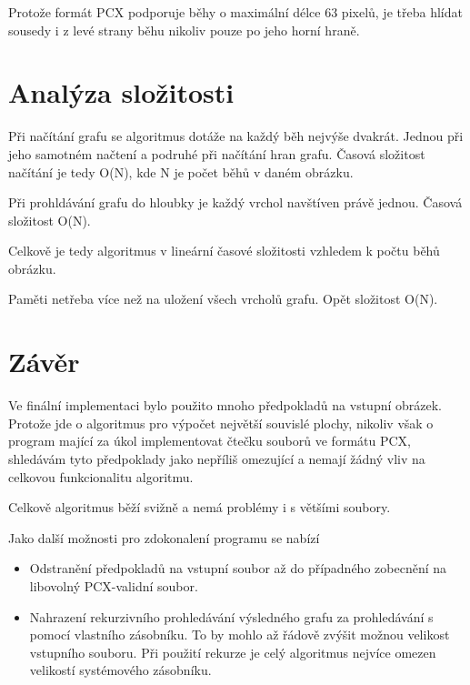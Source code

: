 \documentclass[12pt,a4paper]{article}
\begin{document}
Protože formát PCX podporuje běhy o maximální délce 63 pixelů, je třeba hlídat sousedy i z levé strany běhu nikoliv pouze po jeho horní hraně.

\section{Analýza složitosti}

Při načítání grafu se algoritmus dotáže na každý běh nejvýše dvakrát. Jednou při jeho samotném načtení a podruhé při načítání hran grafu. Časová složitost načítání je tedy O(N), kde N je počet běhů v daném obrázku.

Při prohldávání grafu do hloubky je každý vrchol navštíven právě jednou. Časová složitost O(N).

Celkově je tedy algoritmus v lineární časové složitosti vzhledem k počtu běhů obrázku.

Paměti netřeba více než na uložení všech vrcholů grafu. Opět složitost O(N).

\section{Závěr}

Ve finální implementaci bylo použito mnoho předpokladů na vstupní obrázek. Protože jde o algoritmus pro výpočet největší souvislé plochy, nikoliv však o program mající za úkol implementovat čtečku souborů ve formátu PCX, shledávám tyto předpoklady jako nepříliš omezující a nemají žádný vliv na celkovou funkcionalitu algoritmu.

Celkově algoritmus běží svižně a nemá problémy i s většími soubory. 

Jako další možnosti pro zdokonalení programu se nabízí
\begin{itemize}
\item Odstranění předpokladů na vstupní soubor až do případného zobecnění na libovolný PCX-validní soubor.
\item Nahrazení rekurzivního prohledávání výsledného grafu za prohledávání s pomocí vlastního zásobníku. To by mohlo až řádově zvýšit možnou velikost vstupního souboru. Při použití rekurze je celý algoritmus nejvíce omezen velikostí systémového zásobníku.
\end{itemize}
\end{document}
